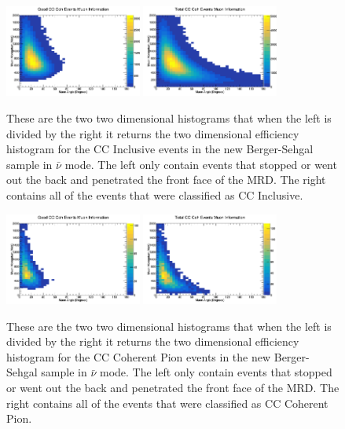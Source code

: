 \documentclass[11pt]{article}
\begin{document}
\begin{figure}[H]
\centering
\includegraphics[width=0.4\textwidth]{NewANMBergerSehgalImages/6-GoodCCCohMuonInfoANMBS.png}
\includegraphics[width=0.4\textwidth]{NewANMBergerSehgalImages/9-TotalCCCohMuonInfoANMBS.png}
\caption{These are the two two dimensional histograms that when the left is divided by the right it returns the two dimensional efficiency histogram for the CC Inclusive events in the new Berger-Sehgal sample in $\bar{\nu}$ mode. The left only contain events that stopped or went out the back and penetrated the front face of the MRD. The right contains all of the events that were classified as CC Inclusive.}
\end{figure}

\begin{figure}[H]
\centering
\includegraphics[width=0.4\textwidth]{NewANMBergerSehgalImages/7.png}
\includegraphics[width=0.4\textwidth]{NewANMBergerSehgalImages/8.png}
\caption{These are the two two dimensional histograms that when the left is divided by the right it returns the two dimensional efficiency histogram for the CC Coherent Pion events in the new Berger-Sehgal sample in $\bar{\nu}$ mode. The left only contain events that stopped or went out the back and penetrated the front face of the MRD. The right contains all of the events that were classified as CC Coherent Pion.}
\end{figure}
\end{document}

